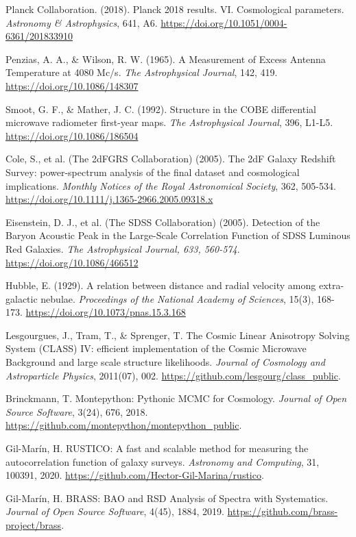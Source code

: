 
\begin{thebibliography}{999}
	 Planck Collaboration. (2018). Planck 2018 results. VI\@. Cosmological parameters. \textit{Astronomy \& Astrophysics}, 641, A6. \url{https://doi.org/10.1051/0004-6361/201833910}

	 Penzias, A. A., \& Wilson, R. W. (1965). A Measurement of Excess Antenna Temperature at 4080 Mc/s. \textit{The Astrophysical Journal}, 142, 419. \url{https://doi.org/10.1086/148307}

 Smoot, G. F., \& Mather, J. C. (1992). Structure in the COBE differential microwave radiometer first-year maps. \textit{The Astrophysical Journal}, 396, L1-L5. \url{https://doi.org/10.1086/186504}

 Cole, S., et al. (The 2dFGRS Collaboration) (2005). The 2dF Galaxy Redshift Survey: power-spectrum analysis of the final dataset and cosmological implications. \textit{Monthly Notices of the Royal Astronomical Society}, 362, 505-534. \url{https://doi.org/10.1111/j.1365-2966.2005.09318.x}

 Eisenstein, D. J., et al. (The SDSS Collaboration) (2005). Detection of the Baryon Acoustic Peak in the Large-Scale Correlation Function of SDSS Luminous Red Galaxies. \textit{The Astrophysical Journal, 633, 560-574}. \url{https://doi.org/10.1086/466512}

 Hubble, E. (1929). A relation between distance and radial velocity among extra-galactic nebulae. \textit{Proceedings of the National Academy of Sciences}, 15(3), 168-173. \url{https://doi.org/10.1073/pnas.15.3.168}

 Lesgourgues, J., Tram, T., \& Sprenger, T. The Cosmic Linear Anisotropy Solving System (CLASS) IV: efficient implementation of the Cosmic Microwave Background and large scale structure likelihoods. \textit{Journal of Cosmology and Astroparticle Physics}, 2011(07), 002. \url{https://github.com/lesgourg/class_public}.

 Brinckmann, T. Montepython: Pythonic MCMC for Cosmology. \textit{Journal of Open Source Software}, 3(24), 676, 2018. \url{https://github.com/montepython/montepython_public}.

 Gil-Marín, H. RUSTICO: A fast and scalable method for measuring the autocorrelation function of galaxy surveys. \textit{Astronomy and Computing}, 31, 100391, 2020. \url{https://github.com/Hector-Gil-Marina/rustico}.

 Gil-Marín, H. BRASS: BAO and RSD Analysis of Spectra with Systematics. \textit{Journal of Open Source Software}, 4(45), 1884, 2019. \url{https://github.com/brass-project/brass}.

\end{thebibliography}
